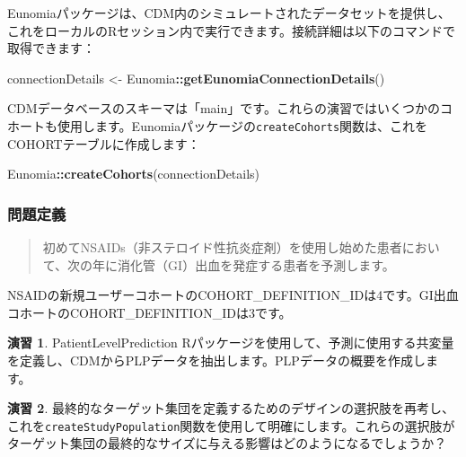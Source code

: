 \documentclass[
  11pt]{book}
\newenvironment{Shaded}{\begin{snugshade}}{\end{snugshade}}
\newcommand{\FunctionTok}[1]{\textcolor[rgb]{0.13,0.29,0.53}{\textbf{#1}}}
\newcommand{\NormalTok}[1]{#1}
\newcommand{\OtherTok}[1]{\textcolor[rgb]{0.56,0.35,0.01}{#1}}
\newcommand{\SpecialCharTok}[1]{\textcolor[rgb]{0.81,0.36,0.00}{\textbf{#1}}}
\theoremstyle{definition}
\theoremstyle{definition}
\theoremstyle{definition}
\newtheorem{exercise}{演習}[chapter]
\theoremstyle{definition}
\theoremstyle{remark}
\begin{document}
Eunomiaパッケージは、CDM内のシミュレートされたデータセットを提供し、これをローカルのRセッション内で実行できます。接続詳細は以下のコマンドで取得できます：

\begin{Shaded}
\begin{Highlighting}[]
\NormalTok{connectionDetails }\OtherTok{\textless{}{-}}\NormalTok{ Eunomia}\SpecialCharTok{::}\FunctionTok{getEunomiaConnectionDetails}\NormalTok{()}
\end{Highlighting}
\end{Shaded}

CDMデータベースのスキーマは「main」です。これらの演習ではいくつかのコホートも使用します。Eunomiaパッケージの\texttt{createCohorts}関数は、これをCOHORTテーブルに作成します：

\begin{Shaded}
\begin{Highlighting}[]
\NormalTok{Eunomia}\SpecialCharTok{::}\FunctionTok{createCohorts}\NormalTok{(connectionDetails)}
\end{Highlighting}
\end{Shaded}

\subsubsection*{問題定義}\label{ux554fux984cux5b9aux7fa9-1}

\begin{quote}
初めてNSAIDs（非ステロイド性抗炎症剤）を使用し始めた患者において、次の年に消化管（GI）出血を発症する患者を予測します。
\end{quote}

NSAIDの新規ユーザーコホートのCOHORT\_DEFINITION\_IDは4です。GI出血コホートのCOHORT\_DEFINITION\_IDは3です。

\begin{exercise}
\protect\hypertarget{exr:exercisePlp1}{}\label{exr:exercisePlp1}PatientLevelPrediction Rパッケージを使用して、予測に使用する共変量を定義し、CDMからPLPデータを抽出します。PLPデータの概要を作成します。
\end{exercise}

\begin{exercise}
\protect\hypertarget{exr:exercisePlp2}{}\label{exr:exercisePlp2}最終的なターゲット集団を定義するためのデザインの選択肢を再考し、これを\texttt{createStudyPopulation}関数を使用して明確にします。これらの選択肢がターゲット集団の最終的なサイズに与える影響はどのようになるでしょうか？
\end{exercise}
\end{document}
